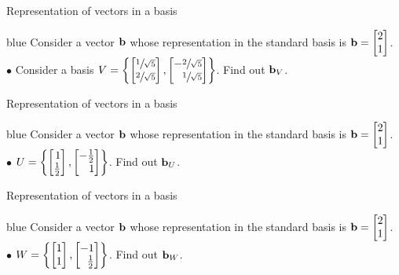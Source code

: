 \documentclass[aspectratio=169]{beamer}
\def\mf{\ensuremath\mathbf}
\def\lc{\ensuremath\left\{}
\def\rc{\ensuremath\right\}}
\begin{document}
\begin{frame}[t]{Representation of vectors in a basis}
\begin{color}{blue}
    Consider a vector $\mf{b}$ whose representation in the standard basis is $\mf{b} = \begin{bmatrix*}2\\1\end{bmatrix*}$. \\

    $\bullet$ Consider a basis $V = \lc \begin{bmatrix*}[r]\sfrac{1}{\sqrt{5}}\\\sfrac{2}{\sqrt{5}}\end{bmatrix*}, \begin{bmatrix*}[r]-\sfrac{2}{\sqrt{5}}\\\sfrac{1}{\sqrt{5}}\end{bmatrix*} \rc$. Find out $\mf{b}_V$.
\end{color}
\end{frame}


\begin{frame}[t]{Representation of vectors in a basis}
\begin{color}{blue}
    Consider a vector $\mf{b}$ whose representation in the standard basis is $\mf{b} = \begin{bmatrix*}2\\1\end{bmatrix*}$. \\

    $\bullet$ $ U = \lc \begin{bmatrix*}[r]1\\\frac{1}{2}\end{bmatrix*}, \begin{bmatrix*}[r]-\frac{1}{2}\\1\end{bmatrix*} \rc$. Find out $\mf{b}_U$.
\end{color}
\end{frame}


\begin{frame}[t]{Representation of vectors in a basis}
\begin{color}{blue}
    Consider a vector $\mf{b}$ whose representation in the standard basis is $\mf{b} = \begin{bmatrix*}2\\1\end{bmatrix*}$. \\

    $\bullet$ $W = \lc \begin{bmatrix*}[r]1\\1\end{bmatrix*}, \begin{bmatrix*}[r]-1\\\frac{1}{2}\end{bmatrix*} \rc$. Find out $\mf{b}_W$.
\end{color}
\end{frame}
\end{document}
